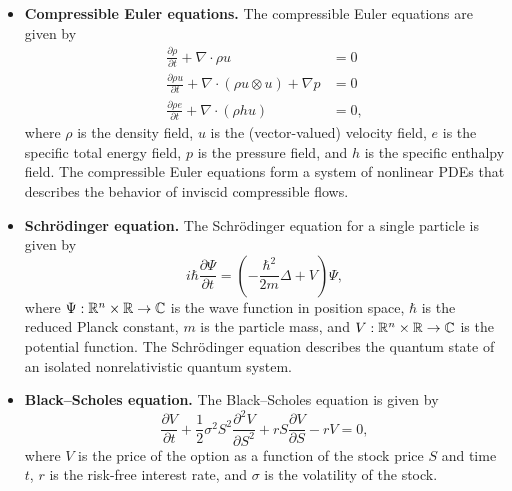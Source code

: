 \begin{itemize}
\begin{align*}
        \nabla \cdot u &= 0,
    \end{align*}
    where $u$ is the (vector-valued) velocity field, $p$ is the (scalar-valued) pressure field, and $\mathrm{Re}$ is the Reynolds number. The incompressible Navier--Stokes equations comprise a system of nonlinear PDEs that describe the velocity and pressure of an incompressible (Newtonian) flow.
    \item \textbf{Compressible Euler equations.} The compressible Euler equations are given by
    \begin{align*}
        \frac{\partial \rho}{\partial t} + \nabla \cdot \rho u &= 0 \\
        \frac{\partial \rho u}{\partial t} + \nabla \cdot (\rho u \otimes u) + \nabla p &= 0 \\
        \frac{\partial \rho e}{\partial t} + \nabla \cdot (\rho h u) &= 0,
    \end{align*}
    where $\rho$ is the density field, $u$ is the (vector-valued) velocity field, $e$ is the specific total energy field, $p$ is the pressure field, and $h$ is the specific enthalpy field. The compressible Euler equations form a system of nonlinear PDEs that describes the behavior of inviscid compressible flows.
    \item \textbf{Schr\"odinger equation.} The Schr\"odinger equation for a single particle is given by
    \[i\hbar \frac{\partial \Psi}{\partial t} = \left(-\frac{\hbar^2}{2m} \Delta + V\right) \Psi,\]
    where $\Psi : \mathbb{R}^n \times \mathbb{R} \to \mathbb{C}$ is the wave function in position space, $\hbar$ is the reduced Planck constant, $m$ is the particle mass, and $V : \mathbb{R}^n \times \mathbb{R} \to \mathbb{C}$ is the potential function. The Schr\"odinger equation describes the quantum state of an isolated nonrelativistic quantum system.
    \item \textbf{Black--Scholes equation.} The Black--Scholes equation is given by
    \[\frac{\partial V}{\partial t} + \frac{1}{2} \sigma^2 S^2 \frac{\partial^2 V}{\partial S^2} + rS \frac{\partial V}{\partial S} - rV = 0,\]
    where $V$ is the price of the option as a function of the stock price $S$ and time $t$, $r$ is the risk-free interest rate, and $\sigma$ is the volatility of the stock.
\end{itemize}

